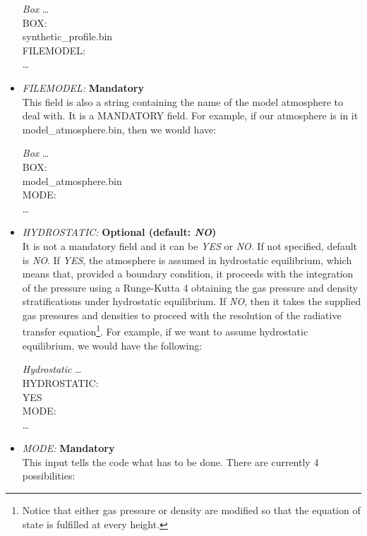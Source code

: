\begin{itemize}
\begin{ifbox}[label={tb:box}]{{\it Box}}
  \scriptsize
  \ldots\\
  BOX:\\
  synthetic\_profile.bin\\
  FILEMODEL:\\
  \ldots
  \normalsize
\end{ifbox}
  \item {\it FILEMODEL:} {\bf Mandatory}\\
  This field is also a string containing the name of the model atmosphere to deal with. It is a MANDATORY field. For example, if our atmosphere is in {it model\_atmosphere.bin}, then we would have:\\
\begin{ifbox}[label={tb:box}]{{\it Box}}
  \scriptsize
  \ldots\\
  BOX:\\
  model\_atmosphere.bin\\
  MODE:\\
  \ldots
  \normalsize
\end{ifbox}
  \item {\it HYDROSTATIC:} {\bf Optional (default: {\it NO})}\\
  It is not a mandatory field and it can be {\it YES} or {\it NO}. If not specified, default is {\it NO}. If {\it YES}, the atmosphere is assumed in hydrostatic equilibrium, which means that, provided a boundary condition, it proceeds with the integration of the pressure using a Runge-Kutta 4 obtaining the gas pressure and density stratifications under hydrostatic equilibrium. If {\it NO}, then it takes the supplied gas pressures and densities to proceed with the resolution of the radiative transfer equation\footnote{Notice that either gas pressure or density are modified so that the equation of state is fulfilled at every height.}. For example, if we want to assume hydrostatic equilibrium, we would have the following:\\
\begin{ifbox}[label={tb:hydrostatic}]{{\it Hydrostatic}}
  \scriptsize
  \ldots\\
  HYDROSTATIC:\\
  YES\\
  MODE:\\
  \ldots
  \normalsize
\end{ifbox}
  \item {\it MODE:} {\bf Mandatory}\\
  This input tells the code what has to be done. There are currently 4 possibilities:
  \begin{itemize}

\end{itemize}
\end{itemize}
